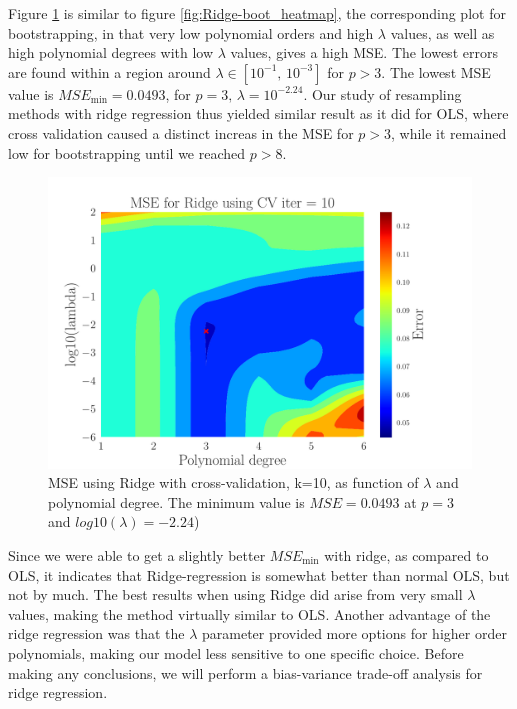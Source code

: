 \documentclass[reprint,english,notitlepage,aps,nobalancelastpage,nofootinbib]{revtex4-1}  %
\begin{document}
Figure \ref{fig:Ridge_CV_heatmap} is similar to figure \ref{fig:Ridge-boot_heatmap}, the corresponding plot for bootstrapping, in that very low polynomial orders and high $\lambda$ values, as well as high polynomial degrees with low $\lambda$ values, gives a high MSE. The lowest errors are found within a region around $\lambda\in[10^{-1},\,10^{-3}]$ for $p>3$. The lowest MSE value is $MSE_\text{min}=0.0493$, for $p=3,\, \lambda=10^{-2.24}$. Our study of resampling methods with ridge regression thus yielded similar result as it did for OLS, where cross validation caused a distinct increas in the MSE for $p>3$, while it remained low for bootstrapping until we reached $p>8$.

\begin{figure}[h]
	\begin{center}
		\includegraphics[width=0.8\linewidth]{Contour_PL_Ridge_CV10_n30_eps0.2_p1_6_lmb2_m6.pdf}
	\end{center}
	\caption{MSE using Ridge with cross-validation, k=10, as function of $\lambda$ and polynomial degree. The minimum value is $MSE=0.0493$ at $p=3$ and $log10(\lambda)=-2.24$)}
	\label{fig:Ridge_CV_heatmap}
\end{figure}

Since we were able to get a slightly better $MSE_\text{min}$ with ridge, as compared to OLS, it indicates that Ridge-regression is somewhat better than normal OLS, but not by much. The best results when using Ridge did arise from very small $\lambda$ values, making the method virtually similar to OLS. Another advantage of the ridge regression was that the $\lambda$ parameter provided more options for higher order polynomials, making our model less sensitive to one specific choice. Before making any conclusions, we will perform a bias-variance trade-off analysis for ridge regression.
\end{document}
